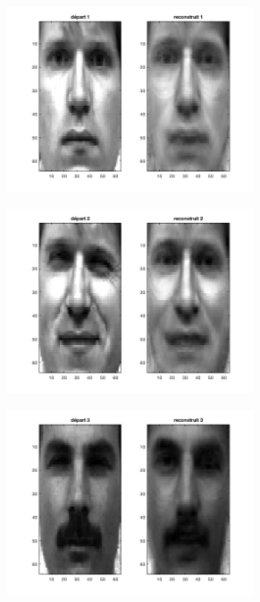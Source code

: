 \documentclass[a4paper]{article}
\begin{document}
\begin{figure}[H]
    \centering
     
    \begin{subfigure}[c]{0.24\textwidth}
        \centering
        \includegraphics[width=0.8\textwidth]{images/ex5_face1.png}
    \end{subfigure}
    \begin{subfigure}[c]{0.24\textwidth}
        \centering
        \includegraphics[width=0.8\textwidth]{images/ex5_face2.png}
    \end{subfigure}    
    \begin{subfigure}[c]{0.24\textwidth}
        \centering
        \includegraphics[width=0.8\textwidth]{images/ex5_face3.png}

\end{subfigure}
\end{figure}
\end{document}
